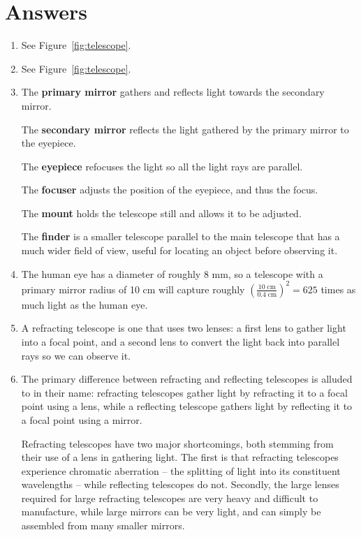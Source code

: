\documentclass[11pt]{article}
\begin{document}
\section{Answers}
\begin{enumerate}[label={\textbf{\emph{(\arabic*)}}}]
	\item %
See Figure~\ref{fig:telescope}.
	\item %
See Figure~\ref{fig:telescope}.
	\item %
The \textbf{primary mirror} gathers and reflects light towards the secondary mirror.

The \textbf{secondary mirror} reflects the light gathered by the primary mirror to the eyepiece.

The \textbf{eyepiece} refocuses the light so all the light rays are parallel.

The \textbf{focuser} adjusts the position of the eyepiece, and thus the focus.

The \textbf{mount} holds the telescope still and allows it to be adjusted.

The \textbf{finder} is a smaller telescope parallel to the main telescope that has a much wider field of view, useful for locating an object before observing it.

	\item %
The human eye has a diameter of roughly 8 mm, so a telescope with a primary mirror radius of 10 cm will capture roughly $\left(\frac{10\;\textrm{cm}}{0.4\;\textrm{cm}}\right)^2 = 625$ times as much light as the human eye.

	\item %
A refracting telescope is one that uses two lenses: a first lens to gather light into a focal point, and a second lens to convert the light back into parallel rays so we can observe it.

	\item %
The primary difference between refracting and reflecting telescopes is alluded to in their name: refracting telescopes gather light by refracting it to a focal point using a lens, while a reflecting telescope gathers light by reflecting it to a focal point using a mirror.

Refracting telescopes have two major shortcomings, both stemming from their use of a lens in gathering light.
The first is that refracting telescopes experience chromatic aberration -- the splitting of light into its constituent wavelengths -- while reflecting telescopes do not.
Secondly, the large lenses required for large refracting telescopes are very heavy and difficult to manufacture, while large mirrors can be very light, and can simply be assembled from many smaller mirrors.


\end{enumerate}
\end{document}
